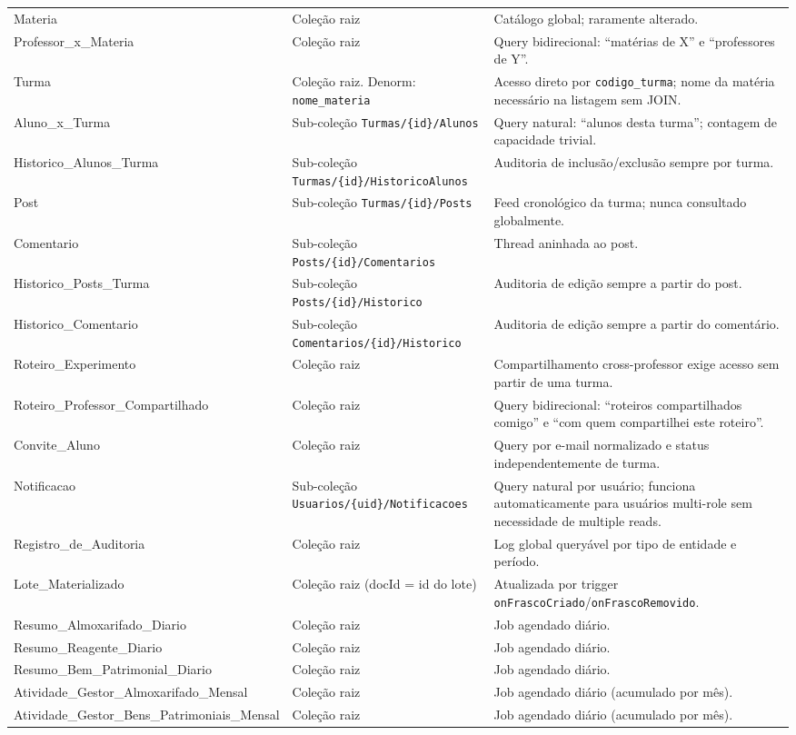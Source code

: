 \documentclass[12pt,a4paper]{article}
\begin{document}
\begin{center}
\begin{longtable}{>{\raggedright\arraybackslash}p{} >{\raggedright\arraybackslash}p{} >{\raggedright\arraybackslash}X}
Materia & Coleção raiz & Catálogo global; raramente alterado.\\
Professor\_x\_Materia & Coleção raiz & Query bidirecional: ``matérias de X'' e ``professores de Y''.\\
Turma & Coleção raiz. Denorm: \texttt{nome\_materia} & Acesso direto por \texttt{codigo\_turma}; nome da matéria necessário na listagem sem JOIN.\\
Aluno\_x\_Turma & Sub-coleção \texttt{Turmas/\{id\}/Alunos} & Query natural: ``alunos desta turma''; contagem de capacidade trivial.\\
Historico\_Alunos\_Turma & Sub-coleção \texttt{Turmas/\{id\}/HistoricoAlunos} & Auditoria de inclusão/exclusão sempre por turma.\\
Post & Sub-coleção \texttt{Turmas/\{id\}/Posts} & Feed cronológico da turma; nunca consultado globalmente.\\
Comentario & Sub-coleção \texttt{Posts/\{id\}/Comentarios} & Thread aninhada ao post.\\
Historico\_Posts\_Turma & Sub-coleção \texttt{Posts/\{id\}/Historico} & Auditoria de edição sempre a partir do post.\\
Historico\_Comentario & Sub-coleção \texttt{Comentarios/\{id\}/Historico} & Auditoria de edição sempre a partir do comentário.\\
Roteiro\_Experimento & Coleção raiz & Compartilhamento cross-professor exige acesso sem partir de uma turma.\\
Roteiro\_Professor\_Compartilhado & Coleção raiz & Query bidirecional: ``roteiros compartilhados comigo'' e ``com quem compartilhei este roteiro''.\\
Convite\_Aluno & Coleção raiz & Query por e-mail normalizado e status independentemente de turma.\\
Notificacao & Sub-coleção \texttt{Usuarios/\{uid\}/Notificacoes} & Query natural por usuário; funciona automaticamente para usuários multi-role sem necessidade de multiple reads.\\
Registro\_de\_Auditoria & Coleção raiz & Log global queryável por tipo de entidade e período.\\
Lote\_Materializado & Coleção raiz (docId = id do lote) & Atualizada por trigger \texttt{onFrascoCriado}/\texttt{onFrascoRemovido}.\\
Resumo\_Almoxarifado\_Diario & Coleção raiz & Job agendado diário.\\
Resumo\_Reagente\_Diario & Coleção raiz & Job agendado diário.\\
Resumo\_Bem\_Patrimonial\_Diario & Coleção raiz & Job agendado diário.\\
Atividade\_Gestor\_Almoxarifado\_Mensal & Coleção raiz & Job agendado diário (acumulado por mês).\\
Atividade\_Gestor\_Bens\_Patrimoniais\_Mensal & Coleção raiz & Job agendado diário (acumulado por mês).\\
\end{longtable}
\end{center}
\end{document}
